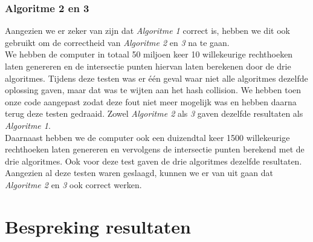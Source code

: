 \documentclass[11pt,a4paper,titlepage]{article}
\begin{document}
			\subsubsection{Algoritme 2 en 3}
			Aangezien we er zeker van zijn dat \emph{Algoritme 1} correct is, hebben we dit ook gebruikt om de correctheid van \emph{Algoritme 2} en \emph{3} na te gaan.\\
			We hebben de computer in totaal 50 miljoen keer 10 willekeurige rechthoeken laten genereren en de intersectie punten hiervan laten berekenen door de drie algoritmes. Tijdens deze testen was er één geval waar niet alle algoritmes dezelfde oplossing gaven, maar dat was te wijten aan het hash collision. We hebben toen onze code aangepast zodat deze fout niet meer mogelijk was en hebben daarna terug deze testen gedraaid. Zowel \emph{Algoritme 2} als \emph{3} gaven dezelfde resultaten als \emph{Algoritme 1}. \\
			Daarnaast hebben we de computer ook een duizendtal keer 1500 willekeurige rechthoeken laten genereren en vervolgens de intersectie punten berekend met de drie algoritmes. Ook voor deze test gaven de drie algoritmes dezelfde resultaten.\\
			Aangezien al deze testen waren geslaagd, kunnen we er van uit gaan dat \emph{Algoritme 2} en \emph{3} ook correct werken.		
	\section{Bespreking resultaten}
\end{document}
